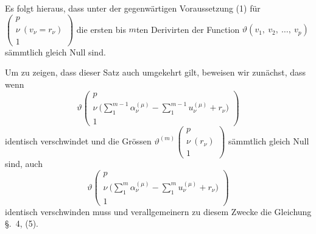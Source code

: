 \documentclass[12pt,a4paper]{book}
\theoremstyle{definition}
\theoremstyle{remark}
\begin{document}
Es folgt hieraus, dass unter der gegenwärtigen Voraussetzung (1) für $\left(\begin{array}{c} p\\ \nu\ (v_\nu = r_\nu)\\ 1 \end{array}\right)$ die ersten bis $m$ten Derivirten der Function $\vartheta(v_1,\ v_2,\ \ldots,\ v_p)$ sämmtlich gleich Null sind.

Um zu zeigen, dass dieser Satz auch umgekehrt gilt, beweisen wir zunächst, dass wenn
\[ \vartheta\left(\begin{array}{c} p\\ \nu\ \bigl(\sum\limits_1^{m-1} \alpha_\nu^{(\mu)} - \sum\limits_1^{m-1} u_\nu^{(\mu)} + r_\nu\bigr)\\ 1 \end{array}\right) \]
identisch verschwindet und die Grössen $\vartheta^{(m)}\left(\begin{array}{c} p\\ \nu\ (r_\nu)\\ 1 \end{array}\right)$ sämmtlich gleich Null sind, auch
\[ \vartheta\left(\begin{array}{c} p\\ \nu\ \bigl(\sum\limits_1^m \alpha_\nu^{(\mu)} - \sum\limits_1^m u_\nu^{(\mu)} + r_\nu\bigr)\\ 1 \end{array}\right) \]
identisch verschwinden muss und verallgemeinern zu diesem Zwecke die Gleichung \S.~4, (5).

\newpage
\end{document}
